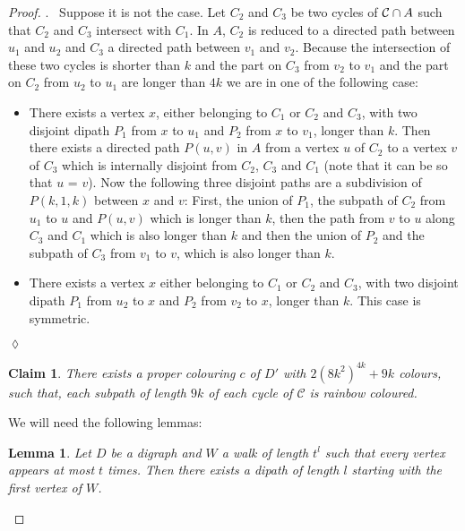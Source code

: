 \documentclass[utf8,10pt]{article}
\theoremstyle{plain}
\newtheorem{lemma}[theorem]{Lemma}
\newtheorem{claim}{Claim}[theorem]
\theoremstyle{definition}
\theoremstyle{remark}
\newenvironment{subproof}{\par\noindent {\it Subproof}.\ }{\hfill$\lozenge$\par\vspace{11pt}}
\begin{document}
\begin{proof}
\begin{subproof}
Suppose it is not the case. Let $C_2$ and $C_3$ be two cycles of ${\cal C}\cap A$ such that $C_2$ and $C_3$ intersect with $C_1$.
In $A$, $C_2$ is reduced to a directed path between $u_1$ and $u_2$ and $C_3$ a directed path between $v_1$ and $v_2$.
Because the intersection of these two cycles is shorter than $k$ and the part on $C_3$ from $v_2$ to $v_1$ and the part
on $C_2$ from $u_2$ to $u_1$ are longer than $4k$ we are in one of the following case:
\begin{itemize}
	\item There exists a vertex $x$, either belonging to $C_1$ or $C_2$ and $C_3$, with two disjoint dipath $P_1$ from
	$x$ to $u_1$ and $P_2$ from $x$ to $v_1$, longer than $k$. Then there exists a directed path $P(u,v)$ in $A$ from
	a vertex $u$ of $C_2$ to a vertex $v$ of $C_3$ which is internally disjoint from  $C_2$, $C_3$ and $C_1$
	(note that it can be so that $u$ = $v$). Now the following three disjoint paths are a subdivision of $P(k,1,k)$ between $x$ and $v$:
	First, the union of $P_1$, the subpath of $C_2$ from $u_1$ to $u$ and $P(u,v)$ which is longer than $k$, then the path from $v$ to $u$
	along $C_3$ and $C_1$ which is also longer than $k$ and then the union of $P_2$ and the subpath of $C_3$ from $v_1$ to $v$, which is also longer than $k$.
	\item There exists a vertex $x$ either belonging to $C_1$ or $C_2$ and $C_3$, with two disjoint dipath $P_1$ from
	$u_2$ to $x$ and $P_2$ from $v_2$ to $x$, longer than $k$. This case is symmetric.
\end{itemize}
\end{subproof}











\begin{claim}
There exists a proper colouring $c$ of $D'$ with $2(8k^2)^{4k} + 9k$ colours, such that, each subpath of length $9k$ of each cycle of $\mathcal{C}$ is rainbow coloured.
\end{claim}







We will need the following lemmas:

\begin{lemma}\label{walk}
Let $D$ be a digraph and $W$ a walk of length $t^l$ such that every vertex appears at most $t$ times.
Then there exists a dipath of length $l$ starting with the first vertex of $W$.
\end{lemma}


\end{proof}
\end{document}
